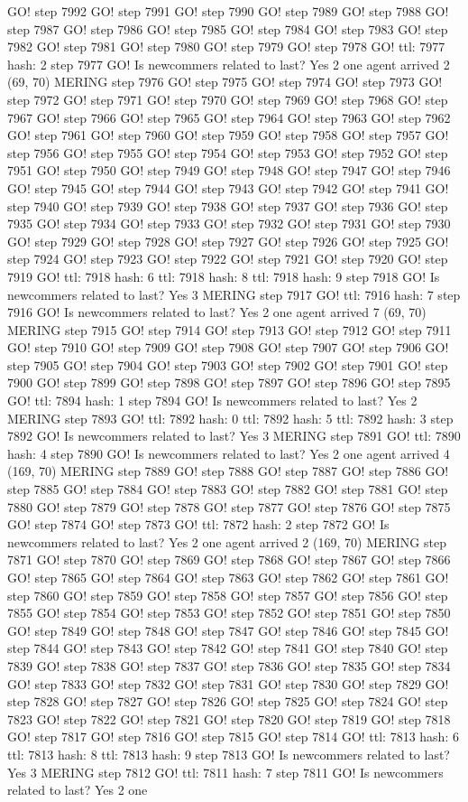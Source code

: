 GO! step 7992 GO! step 7991 GO! step 7990 GO! step 7989 GO! step 7988 GO! step 7987 GO! step 7986 GO! step 7985 GO! step 7984 GO! step 7983 GO! step 7982 GO! step 7981 GO! step 7980 GO! step 7979 GO! step 7978 GO! ttl: 7977 hash: 2 step 7977 GO! Is newcommers related to last? Yes 2 one agent arrived 2 (69, 70) MERING step 7976 GO! step 7975 GO! step 7974 GO! step 7973 GO! step 7972 GO! step 7971 GO! step 7970 GO! step 7969 GO! step 7968 GO! step 7967 GO! step 7966 GO! step 7965 GO! step 7964 GO! step 7963 GO! step 7962 GO! step 7961 GO! step 7960 GO! step 7959 GO! step 7958 GO! step 7957 GO! step 7956 GO! step 7955 GO! step 7954 GO! step 7953 GO! step 7952 GO! step 7951 GO! step 7950 GO! step 7949 GO! step 7948 GO! step 7947 GO! step 7946 GO! step 7945 GO! step 7944 GO! step 7943 GO! step 7942 GO! step 7941 GO! step 7940 GO! step 7939 GO! step 7938 GO! step 7937 GO! step 7936 GO! step 7935 GO! step 7934 GO! step 7933 GO! step 7932 GO! step 7931 GO! step 7930 GO! step 7929 GO! step 7928 GO! step 7927 GO! step 7926 GO! step 7925 GO! step 7924 GO! step 7923 GO! step 7922 GO! step 7921 GO! step 7920 GO! step 7919 GO! ttl: 7918 hash: 6 ttl: 7918 hash: 8 ttl: 7918 hash: 9 step 7918 GO! Is newcommers related to last? Yes 3 MERING step 7917 GO! ttl: 7916 hash: 7 step 7916 GO! Is newcommers related to last? Yes 2 one agent arrived 7 (69, 70) MERING step 7915 GO! step 7914 GO! step 7913 GO! step 7912 GO! step 7911 GO! step 7910 GO! step 7909 GO! step 7908 GO! step 7907 GO! step 7906 GO! step 7905 GO! step 7904 GO! step 7903 GO! step 7902 GO! step 7901 GO! step 7900 GO! step 7899 GO! step 7898 GO! step 7897 GO! step 7896 GO! step 7895 GO! ttl: 7894 hash: 1 step 7894 GO! Is newcommers related to last? Yes 2 MERING step 7893 GO! ttl: 7892 hash: 0 ttl: 7892 hash: 5 ttl: 7892 hash: 3 step 7892 GO! Is newcommers related to last? Yes 3 MERING step 7891 GO! ttl: 7890 hash: 4 step 7890 GO! Is newcommers related to last? Yes 2 one agent arrived 4 (169, 70) MERING step 7889 GO! step 7888 GO! step 7887 GO! step 7886 GO! step 7885 GO! step 7884 GO! step 7883 GO! step 7882 GO! step 7881 GO! step 7880 GO! step 7879 GO! step 7878 GO! step 7877 GO! step 7876 GO! step 7875 GO! step 7874 GO! step 7873 GO! ttl: 7872 hash: 2 step 7872 GO! Is newcommers related to last? Yes 2 one agent arrived 2 (169, 70) MERING step 7871 GO! step 7870 GO! step 7869 GO! step 7868 GO! step 7867 GO! step 7866 GO! step 7865 GO! step 7864 GO! step 7863 GO! step 7862 GO! step 7861 GO! step 7860 GO! step 7859 GO! step 7858 GO! step 7857 GO! step 7856 GO! step 7855 GO! step 7854 GO! step 7853 GO! step 7852 GO! step 7851 GO! step 7850 GO! step 7849 GO! step 7848 GO! step 7847 GO! step 7846 GO! step 7845 GO! step 7844 GO! step 7843 GO! step 7842 GO! step 7841 GO! step 7840 GO! step 7839 GO! step 7838 GO! step 7837 GO! step 7836 GO! step 7835 GO! step 7834 GO! step 7833 GO! step 7832 GO! step 7831 GO! step 7830 GO! step 7829 GO! step 7828 GO! step 7827 GO! step 7826 GO! step 7825 GO! step 7824 GO! step 7823 GO! step 7822 GO! step 7821 GO! step 7820 GO! step 7819 GO! step 7818 GO! step 7817 GO! step 7816 GO! step 7815 GO! step 7814 GO! ttl: 7813 hash: 6 ttl: 7813 hash: 8 ttl: 7813 hash: 9 step 7813 GO! Is newcommers related to last? Yes 3 MERING step 7812 GO! ttl: 7811 hash: 7 step 7811 GO! Is newcommers related to last? Yes 2 one 